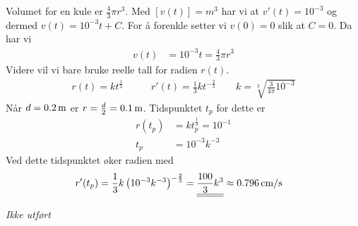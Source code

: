 \documentclass[a4paper,norsk,12pt]{article}
\begin{document}
Volumet for en kule er $\frac{4}{3}\pi r^3$. Med $[v(t)] = \unit{m^3}$ har vi
at $v'(t) = 10^{-3}$ og dermed $v(t) = 10^{-3}t + C$.
For å forenkle setter vi $v(0)=0$ slik at $C=0$. Da har vi
\begin{align*}
  v(t) &= 10^{-3}t = \frac{4}{3}\pi r^3
\end{align*}
Videre vil vi bare bruke reelle tall for radien $r(t)$.
\begin{align*}
  r(t) = kt^\frac{1}{3} & \qquad
    r'(t)  = \frac{1}{3}kt^{-\frac{2}{3}} \qquad
      k  = \sqrt[3]{\frac{3}{4\pi}10^{-3}}
\end{align*}
Når $d=\unit[0.2]{m}$ er $r=\frac{d}{2}=\unit[0.1]{m}$. Tidspunktet $t_p$ for
dette er
\begin{align*}
  r(t_p) &= kt_p^\frac{1}{3} = 10^{-1} \\
  t_p &= 10^{-3}k^{-3}
\end{align*}
Ved dette tidspunktet øker radien med
\begin{align*}
  r'(t_p) &= \frac{1}{3}k\left(10^{-3}k^{-3}\right)^{-\frac{2}{3}} =
  \svar{\frac{100}{3}k^3} \approx \unit[0.796]{cm/s}
\end{align*}

\textit{Ikke utført}
\end{document}

